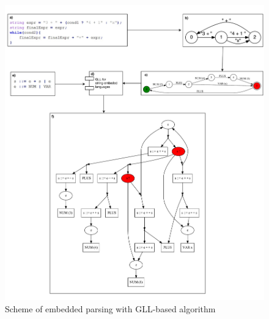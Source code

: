 \documentclass{sig-alternate} %
\begin{document}
\begin{figure}[t]
\centering
\includegraphics[width=17cm]{pic}
\caption{Scheme of embedded parsing with GLL-based algorithm}
  \label{fig:videocomparison}
\end{figure}
\end{document}
